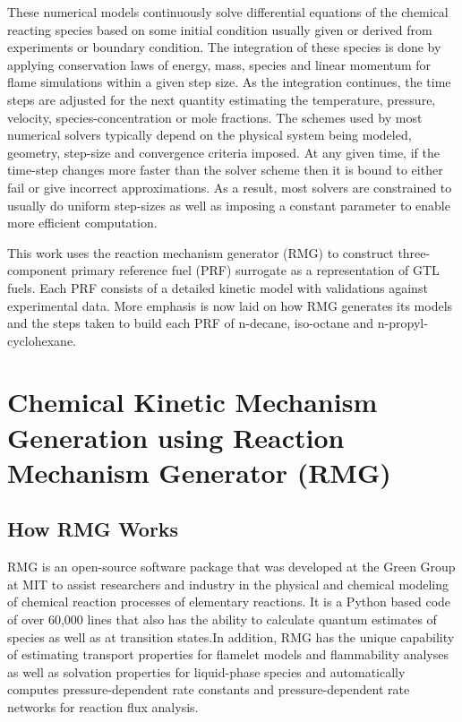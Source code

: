  These numerical models continuously solve differential equations of the chemical reacting species based on some initial condition usually given or derived from experiments or boundary condition. The integration of these species is done by applying conservation laws of energy, mass, species and linear momentum for flame simulations within a given step size. As the integration continues, the time steps are adjusted for the next quantity estimating the temperature, pressure, velocity, species-concentration or mole fractions. The schemes used by most numerical solvers typically depend on the physical system being modeled, geometry, step-size and convergence criteria imposed. At any given time, if the time-step changes more faster than the solver scheme then it is bound to either fail or give incorrect approximations. As a result, most solvers are constrained to usually do uniform step-sizes as well as imposing a constant parameter to enable more efficient computation. 
 
 This work uses the reaction mechanism generator (RMG)\cite{Gao2016ReactionMechanisms}\cite{Allen2012AutomaticCoefficients}\cite{Magoon2013DesignGeneration} to construct three-component primary reference fuel (PRF) surrogate as a representation of GTL fuels. Each PRF consists of a detailed kinetic model with validations against experimental data. More emphasis is now laid on how RMG generates its models and the steps taken to build each PRF of n-decane, iso-octane and n-propyl-cyclohexane. 
 
 \newpage
 
 \section{Chemical Kinetic Mechanism Generation using Reaction Mechanism Generator (RMG)}
 \subsection{How RMG Works}
 RMG is an open-source software package that was developed at the Green Group at MIT to assist researchers and industry in the physical and chemical modeling of chemical reaction processes of elementary reactions. It is a Python based code of over 60,000 lines that also has the ability to calculate quantum estimates of species as well as at transition states.In addition, RMG has the unique capability of estimating transport properties for flamelet models and flammability analyses as well as solvation properties for liquid-phase species and automatically computes pressure-dependent rate constants and pressure-dependent rate networks for reaction flux analysis.
 
